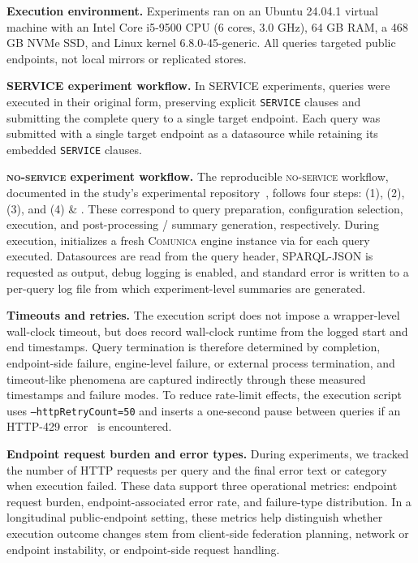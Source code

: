 \documentclass[runningheads]{llncs}
\begin{document}
\textbf{Execution environment.}
Experiments ran on an Ubuntu 24.04.1 virtual machine with an Intel Core i5-9500 CPU (6 cores, 3.0 GHz), 64 GB RAM, a 468 GB NVMe SSD, and Linux kernel 6.8.0-45-generic. 
All queries targeted public endpoints, not local mirrors or replicated stores.

\textbf{\textsc{SERVICE} experiment workflow.}
In \textsc{SERVICE} experiments, queries were executed in their original form, preserving explicit \texttt{SERVICE} clauses and submitting the complete query to a single target endpoint. 
Each query was submitted with a single target endpoint as a datasource while retaining its embedded \texttt{SERVICE} clauses.

\textbf{\textsc{no-service} experiment workflow.}
The reproducible \textsc{no-service} workflow, documented in the study's experimental repository~\cite{fedSparqlSurveyExperimentsRepo}, follows four steps:
(1)\textsc{}, (2)\textsc{}, 
(3)\textsc{}, and (4)\textsc{} \& \textsc{}.
These correspond to query preparation, configuration selection, execution, and post-processing / summary generation, respectively. 
During execution, \texttt{} initializes a fresh \textsc{Comunica} engine instance via \texttt{} for each query executed. 
Datasources are read from the query header, SPARQL-JSON\cite{sparql11resultsjson} is requested as output, debug logging is enabled, and standard error is written to a per-query log file from which experiment-level summaries are generated. 

\textbf{Timeouts and retries.}
The execution script does not impose a wrapper-level wall-clock timeout, but does record wall-clock runtime from the logged start and end timestamps. 
Query termination is therefore determined by completion, endpoint-side failure, engine-level failure, or external process termination, and timeout-like phenomena are captured indirectly through these measured timestamps and failure modes. 
To reduce rate-limit effects, the execution script uses \texttt{--httpRetryCount=50} and inserts a one-second pause between queries if an HTTP-429 error~\cite{Nottingham2012RFC6585} is encountered.

\textbf{Endpoint request burden and error types.}
During experiments, we tracked the number of HTTP requests per query and the final error text or category when execution failed. 
These data support three operational metrics: endpoint request burden, endpoint-associated error rate, and failure-type distribution. 
In a longitudinal public-endpoint setting, these metrics help distinguish whether execution outcome changes stem from client-side federation planning, network or endpoint instability, or endpoint-side request handling.
\end{document}
